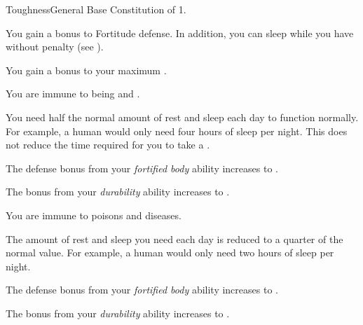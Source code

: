     \begin{feat}{Toughness}{General}
        \featpre Base Constitution of 1.

         You gain a  bonus to Fortitude defense.
        In addition, you can sleep while you have  without penalty (see ).

         You gain a  bonus to your maximum .

         You are immune to being \sickened and \nauseated.

         You need half the normal amount of rest and sleep each day to function normally.
        For example, a human would only need four hours of sleep per night.
        This does not reduce the time required for you to take a .

         The defense bonus from your \textit{fortified body} ability increases to .

         The bonus from your \textit{durability} ability increases to .

         You are immune to poisons and diseases.

         The amount of rest and sleep you need each day is reduced to a quarter of the normal value.
        For example, a human would only need two hours of sleep per night.

         The defense bonus from your \textit{fortified body} ability increases to .

         The bonus from your \textit{durability} ability increases to .
    \end{feat}

